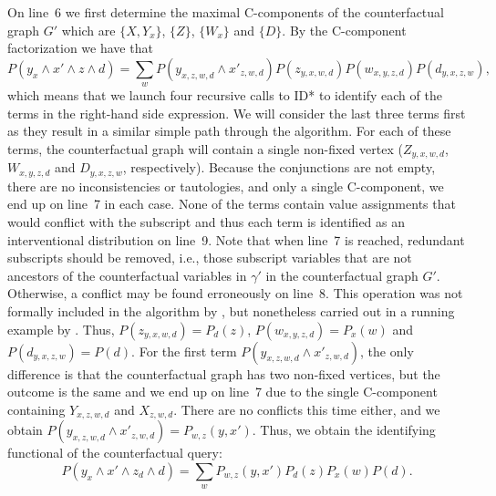 On line~6 we first determine the maximal C-components of the counterfactual graph \(G'\) which are \(\{X, Y_x\}\), \(\{Z\}\), \(\{W_x\}\) and \(\{D\}\). By the C-component factorization we have that 
\begin{equation} \label{eq:idfactors}
  P(y_x \wedge x' \wedge z \wedge d) = \sum_{w} P(y_{x,z,w,d} \wedge x'_{z,w,d})P(z_{y,x,w,d})P(w_{x,y,z,d})P(d_{y,x,z,w}),
\end{equation}
which means that we launch four recursive calls to ID* to identify each of the terms in the right-hand side expression. We will consider the last three terms first as they result in a similar simple path through the algorithm. For each of these terms, the counterfactual graph will contain a single non-fixed vertex (\(Z_{y,x,w,d}\), \(W_{x,y,z,d}\) and \(D_{y,x,z,w}\), respectively). Because the conjunctions are not empty, there are no inconsistencies or tautologies, and only a single C-component, we end up on line~7 in each case. None of the terms contain value assignments that would conflict with the subscript and thus each term is identified as an interventional distribution on line~9. Note that when line~7 is reached, redundant subscripts should be removed, i.e., those subscript variables that are not ancestors of the counterfactual variables in \(\gamma'\) in the counterfactual graph \(G'\). Otherwise, a conflict may be found erroneously on line~8. This operation was not formally included in the algorithm by \citet{shpitser2007}, but nonetheless carried out in a running example by \citet{shpitser2008}. Thus, \(P(z_{y,x,w,d}) = P_{d}(z)\), \(P(w_{x,y,z,d}) = P_{x}(w)\) and \(P(d_{y,x,z,w}) = P(d)\). For the first term \(P(y_{x,z,w,d} \wedge x'_{z,w,d})\), the only difference is that the counterfactual graph has two non-fixed vertices, but the outcome is the same and we end up on line~7 due to the single C-component containing \(Y_{x,z,w,d}\) and \(X_{z,w,d}\). There are no conflicts this time either, and we obtain \(P(y_{x,z,w,d} \wedge x'_{z,w,d}) = P_{w,z}(y,x')\). Thus, we obtain the identifying functional of the counterfactual query:
\[
  P(y_x \wedge x' \wedge z_d \wedge d) = \sum_{w} P_{w,z}(y,x')P_{d}(z)P_{x}(w)P(d).
\]


